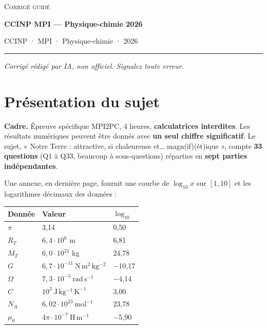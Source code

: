 \documentclass[11pt,a4paper]{article}
\begin{document}
\thispagestyle{plain}
\begin{center}
  {\small\scshape Corrigé guidé}\par\smallskip
  {\LARGE\bfseries CCINP MPI — Physique-chimie 2026\par}\medskip
  {\large CCINP · MPI · Physique-chimie · 2026\par}
\end{center}
\vspace{2pt}\hrule\vspace{8pt}

\emph{Corrigé rédigé par IA, non officiel. Signalez toute erreur.}

\hypertarget{pruxe9sentation-du-sujet}{%
\section{Présentation du sujet}\label{pruxe9sentation-du-sujet}}

\textbf{Cadre.} Épreuve spécifique MPI2PC, 4 heures, \textbf{calculatrices interdites}. Les résultats numériques peuvent être donnés avec \textbf{un seul chiffre significatif}. Le sujet, « Notre Terre : attractive, si chaleureuse et\ldots{} magn(if)(ét)ique », compte \textbf{33 questions} (Q1 à Q33, beaucoup à sous-questions) réparties en \textbf{sept parties indépendantes}.

Une annexe, en dernière page, fournit une courbe de \(\log_{10}x\) sur \([1,10]\) et les logarithmes décimaux des données :

\begin{longtable}[]{@{}lll@{}}
\toprule\noalign{}
Donnée & Valeur & \(\log_{10}\) \\
\midrule\noalign{}
\endhead
\bottomrule\noalign{}
\endlastfoot
\(\pi\) & 3,14 & 0,50 \\
\(R_T\) & \(6{,}4\cdot10^6\) m & 6,81 \\
\(M_T\) & \(6{,}0\cdot10^{24}\) kg & 24,78 \\
\(G\) & \(6{,}7\cdot10^{-11}\ \mathrm{N\,m^2\,kg^{-2}}\) & −10,17 \\
\(\Omega\) & \(7{,}3\cdot10^{-5}\ \mathrm{rad\,s^{-1}}\) & −4,14 \\
\(C\) & \(10^3\ \mathrm{J\,kg^{-1}\,K^{-1}}\) & 3,00 \\
\(N_A\) & \(6{,}02\cdot10^{23}\ \mathrm{mol^{-1}}\) & 23,78 \\
\(\mu_0\) & \(4\pi\cdot10^{-7}\ \mathrm{H\,m^{-1}}\) & −5,90 \\
\end{longtable}
\end{document}
